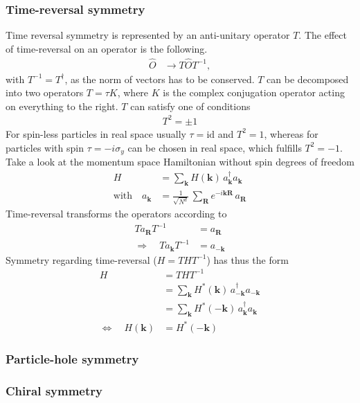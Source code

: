 \subsubsection{Time-reversal symmetry}
Time reversal symmetry is represented by an anti-unitary operator $T$. The effect of time-reversal on an operator is the following.
\begin{align*}
    \hat{O}&\rightarrow T\hat{O}T^{-1},
\end{align*} 
with $T^{-1}=T^\dagger$, as the norm of vectors has to be conserved. $T$ can be decomposed into two operators $T=\tau K$, where $K$ is the complex conjugation operator acting on everything to the right. $T$ can satisfy one of conditions
\begin{align*}
    T^2=\pm1
\end{align*}
For spin-less particles in real space usually $\tau=\text{id}$ and $T^2=1$, whereas for particles with spin $\tau=-i\sigma_y$ can be chosen in real space, which fulfills $T^2=-1$.\\
Take a look at the momentum space Hamiltonian without spin degrees of freedom
\begin{align*}
    H &= \sum_\mathbf{k} H(\mathbf{k})\,a_\mathbf{k}^\dagger a_\mathbf{k}\\
    \text{with}\quad a_\mathbf{k}&=\frac{1}{\sqrt{N^d}}\,\sum_\mathbf{R} e^{-i\mathbf{k}\mathbf{R}}\,a_\mathbf{R}
\end{align*}
Time-reversal transforms the operators according to
\begin{align*}
    Ta_\mathbf{R}T^{-1}&=a_{\mathbf{R}}\\
    \Rightarrow\quad Ta_\mathbf{k}T^{-1}&=a_{-\mathbf{k}}
\end{align*}
Symmetry regarding time-reversal ($H = THT^{-1}$) has thus the form
\begin{align*}
    H &= THT^{-1}\\
    &= \sum_\mathbf{k} H^*(\mathbf{k})\,a_{-\mathbf{k}}^\dagger a_{-\mathbf{k}}\\
    &= \sum_\mathbf{k} H^*(-\mathbf{k})\,a_\mathbf{k}^\dagger a_\mathbf{k}\\
    \iff\quad H(\mathbf{k})&= H^*(-\mathbf{k})
\end{align*}
\subsubsection{Particle-hole symmetry}
\subsubsection{Chiral symmetry}
